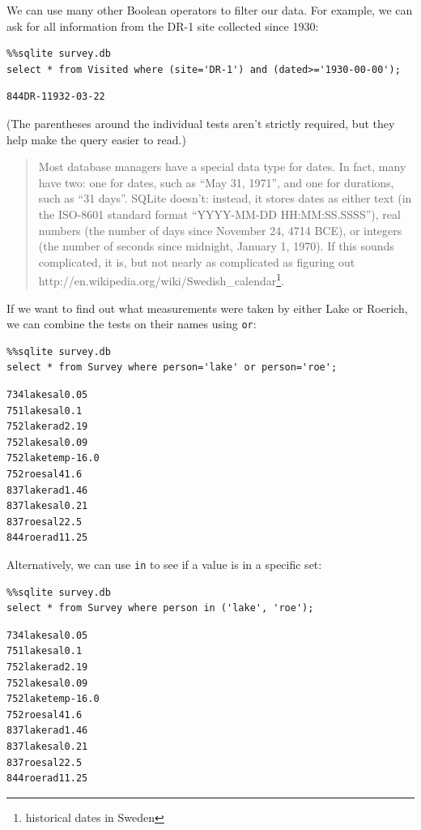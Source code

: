 \documentclass[]{book}
\newcommand{\urlfoot}[2]{{#1}\footnote{#2}}
\begin{document}
We can use many other Boolean operators to filter our data. For example,
we can ask for all information from the DR-1 site collected since 1930:

\begin{verbatim}
%%sqlite survey.db
select * from Visited where (site='DR-1') and (dated>='1930-00-00');
\end{verbatim}

\begin{verbatim}
844DR-11932-03-22
\end{verbatim}

(The parentheses around the individual tests aren't strictly required,
but they help make the query easier to read.)

\begin{quote}
Most database managers have a special data type for dates. In fact, many
have two: one for dates, such as ``May 31, 1971'', and one for
durations, such as ``31 days''. SQLite doesn't: instead, it stores dates
as either text (in the ISO-8601 standard format ``YYYY-MM-DD
HH:MM:SS.SSSS''), real numbers (the number of days since November 24,
4714 BCE), or integers (the number of seconds since midnight, January 1,
1970). If this sounds complicated, it is, but not nearly as complicated
as figuring out
\urlfoot{http://en.wikipedia.org/wiki/Swedish_calendar}{historical dates in
Sweden}.
\end{quote}

If we want to find out what measurements were taken by either Lake or
Roerich, we can combine the tests on their names using \texttt{or}:

\begin{verbatim}
%%sqlite survey.db
select * from Survey where person='lake' or person='roe';
\end{verbatim}

\begin{verbatim}
734lakesal0.05
751lakesal0.1
752lakerad2.19
752lakesal0.09
752laketemp-16.0
752roesal41.6
837lakerad1.46
837lakesal0.21
837roesal22.5
844roerad11.25
\end{verbatim}

Alternatively, we can use \texttt{in} to see if a value is in a specific
set:

\begin{verbatim}
%%sqlite survey.db
select * from Survey where person in ('lake', 'roe');
\end{verbatim}

\begin{verbatim}
734lakesal0.05
751lakesal0.1
752lakerad2.19
752lakesal0.09
752laketemp-16.0
752roesal41.6
837lakerad1.46
837lakesal0.21
837roesal22.5
844roerad11.25
\end{verbatim}
\end{document}
